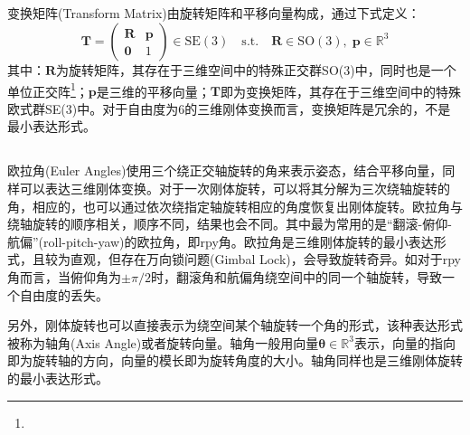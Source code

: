 \subsection{}
变换矩阵(Transform Matrix)由旋转矩阵和平移向量构成，通过下式定义：
\begin{equation}
  \boldsymbol{T}=\begin{pmatrix}
    \boldsymbol{R} & \boldsymbol{p} \\\boldsymbol{0}&1
  \end{pmatrix}\in\mathrm{SE(3)}\quad \mathrm{s.t.}\quad\boldsymbol{R}\in \mathrm{SO(3)},\;\boldsymbol{p}\in \mathbb{R}^3
\end{equation}
其中：$\boldsymbol{R}$为旋转矩阵，其存在于三维空间中的特殊正交群SO(3)中，同时也是一个单位正交阵\footnote{}；$\boldsymbol{p}$是三维的平移向量；$\boldsymbol{T}$即为变换矩阵，其存在于三维空间中的特殊欧式群SE(3)中。对于自由度为6的三维刚体变换而言，变换矩阵是冗余的，不是最小表达形式。
\subsection{}
欧拉角(Euler Angles)使用三个绕正交轴旋转的角来表示姿态，结合平移向量，同样可以表达三维刚体变换。对于一次刚体旋转，可以将其分解为三次绕轴旋转的角，相应的，也可以通过依次绕指定轴旋转相应的角度恢复出刚体旋转。欧拉角与绕轴旋转的顺序相关，顺序不同，结果也会不同。其中最为常用的是“翻滚-俯仰-航偏”(roll-pitch-yaw)的欧拉角，即rpy角。欧拉角是三维刚体旋转的最小表达形式，且较为直观，但存在万向锁问题(Gimbal Lock)，会导致旋转奇异。如对于rpy角而言，当俯仰角为$\pm \pi/2$时，翻滚角和航偏角绕空间中的同一个轴旋转，导致一个自由度的丢失。

另外，刚体旋转也可以直接表示为绕空间某个轴旋转一个角的形式，该种表达形式被称为轴角(Axis Angle)或者旋转向量。轴角一般用向量$\boldsymbol{\theta}\in\mathbb{R}^3$表示，向量的指向即为旋转轴的方向，向量的模长即为旋转角度的大小。轴角同样也是三维刚体旋转的最小表达形式。

